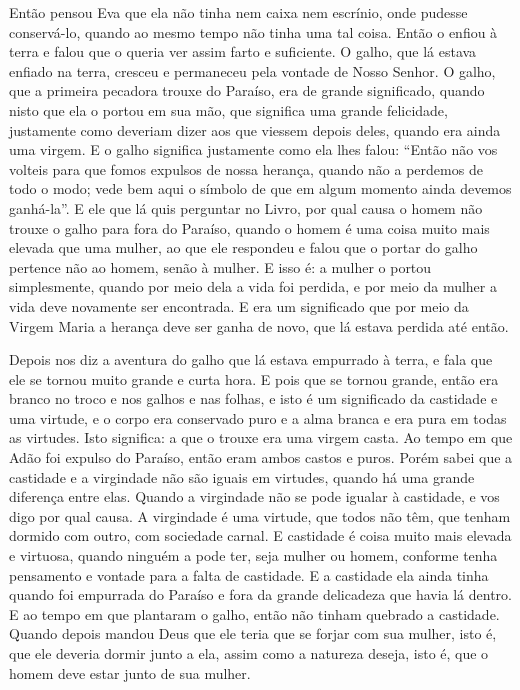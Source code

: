 Então pensou Eva que ela não tinha nem caixa nem escrínio, onde pudesse
conservá-lo, quando ao mesmo tempo não tinha uma tal coisa. Então o enfiou à
terra e falou que o queria ver assim farto e suficiente. O galho, que lá estava
enfiado na terra, cresceu e permaneceu pela vontade de Nosso Senhor. O galho,
que a primeira pecadora trouxe do Paraíso, era de grande significado, quando
nisto que ela o portou em sua mão, que significa uma grande felicidade,
justamente como deveriam dizer aos que viessem depois deles, quando era ainda
uma virgem. E o galho significa justamente como ela lhes falou: “Então não vos
volteis para que fomos expulsos de nossa herança, quando não a perdemos de todo
o modo; vede bem aqui o símbolo de que em algum momento ainda devemos
ganhá-la”. E ele que lá quis perguntar no Livro, por qual causa o homem não
trouxe o galho para fora do Paraíso, quando o homem é uma coisa muito mais
elevada que uma mulher, ao que ele respondeu e falou que o portar do galho
pertence não ao homem, senão à mulher. E isso é: a mulher o portou
simplesmente, quando por meio dela a vida foi perdida, e por meio da mulher a
vida deve novamente ser encontrada. E era um significado que por meio da Virgem
Maria a herança deve ser ganha de novo, que lá estava perdida até então.

Depois nos diz a aventura do galho que lá estava empurrado à terra, e fala que
ele se tornou muito grande e curta hora. E pois que se tornou grande, então era
branco no troco e nos galhos e nas folhas, e isto é um significado da castidade
e uma virtude, e o corpo era conservado puro e a alma branca e era pura em
todas as virtudes. Isto significa: a que o trouxe era uma virgem casta. Ao
tempo em que Adão foi expulso do Paraíso, então eram ambos castos e puros.
Porém sabei que a castidade e a virgindade não são iguais em virtudes, quando
há uma grande diferença entre elas. Quando a virgindade não se pode igualar à
castidade, e vos digo por qual causa. A virgindade é uma virtude, que todos não
têm, que tenham dormido com outro, com sociedade carnal. E castidade é coisa
muito mais elevada e virtuosa, quando ninguém a pode ter, seja mulher ou homem,
conforme tenha pensamento e vontade para a falta de castidade. E a castidade
ela ainda tinha quando foi empurrada do Paraíso e fora da grande delicadeza que
havia lá dentro. E ao tempo em que plantaram o galho, então não tinham quebrado
a castidade. Quando depois mandou Deus que ele teria que se forjar com sua
mulher, isto é, que ele deveria dormir junto a ela, assim como a natureza
deseja, isto é, que o homem deve estar junto de sua mulher.

